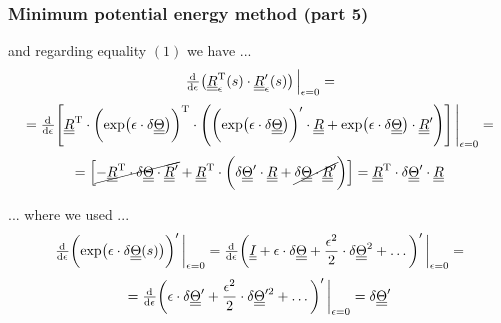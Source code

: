 \begin{frame}
  \frametitle{Minimum potential energy method (part 5)}
  
  and regarding equality $(1)$ we have ...
  \begin{displaymath}
    \od{}{\epsilon} \bigl( \doubleunderline{R}_{\epsilon}^{\mathrm{T}}(s) \cdot \doubleunderline{R}_{\epsilon}^{\prime}(s) \bigr) \sVert[2]_{\epsilon=0} =
  \end{displaymath}
  \begin{displaymath}
    = \od{}{\epsilon} \Biggl[
      \doubleunderline{R}^{\mathrm{T}} \cdot \biggl( \exp \bigl( \epsilon \cdot \delta \doubleunderline{\Theta} \bigr) \biggr)^{\mathrm{T}}
      \cdot \Biggl(
        \biggl( \exp \bigl( \epsilon \cdot \delta \doubleunderline{\Theta} \bigr) \biggr)^{\prime} \cdot \doubleunderline{R}
        + \exp \bigl( \epsilon \cdot \delta \doubleunderline{\Theta} \bigr) \cdot \doubleunderline{R}^{\prime}
      \Biggr)
    \Biggr] \sVert[4]_{\epsilon=0} =
  \end{displaymath}
  \begin{displaymath}
    = \Bigl[
      \cancel{-\underline{\underline{R}}^{\mathrm{T}} \cdot \delta \underline{\underline{\Theta}} \cdot \underline{\underline{R}}^{\prime}} +
        \underline{\underline{R}}^{\mathrm{T}} \cdot
        \biggl(
          \delta \underline{\underline{\Theta}}^{\prime} \cdot \underline{\underline{R}} +
          \cancel{ \delta \underline{\underline{\Theta}} \cdot \underline{\underline{R}}^{\prime} } 
        \biggr)
      \Bigr] =
      \underline{\underline{R}}^{\mathrm{T}} \cdot
      \delta \underline{\underline{\Theta}}^{\prime} \cdot \underline{\underline{R}}
  \end{displaymath}
  
  \vspace{0.5em}
  ... where we used ...
  \begin{displaymath}
    \od{}{\epsilon} \biggl( \exp \bigl( \epsilon \cdot \delta \doubleunderline{\Theta}(s) \bigr) \biggr)^{\prime} \sVert[3]_{\epsilon=0} =
    \od{}{\epsilon} \biggl( \doubleunderline{I} + \epsilon \cdot \delta \doubleunderline{\Theta} + \frac{\epsilon^2}{2} \cdot \delta \doubleunderline{\Theta}^2 + \dots \biggr)^{\prime} \sVert[3]_{\epsilon=0} =
  \end{displaymath}
  \begin{displaymath}
    = \od{}{\epsilon} \biggl( \epsilon \cdot \delta \doubleunderline{\Theta}^{\prime} + \frac{\epsilon^2}{2} \cdot \delta \doubleunderline{\Theta}^{\prime 2} + \dots \biggr)^{\prime} \sVert[3]_{\epsilon=0} =
    \delta \doubleunderline{\Theta}^{\prime} 
  \end{displaymath}
\end{frame}


